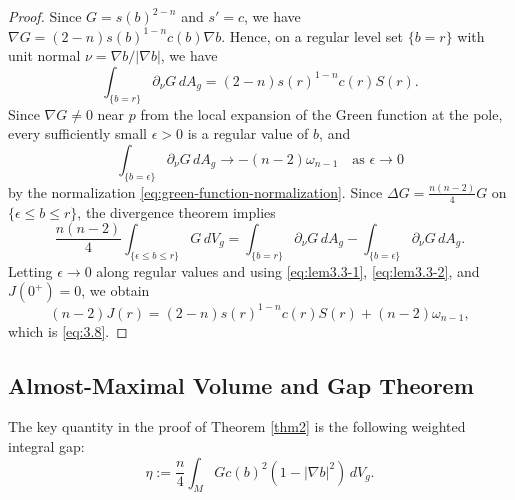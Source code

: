 \documentclass[11pt]{amsart}
\theoremstyle{plain}
\numberwithin{equation}{section}
\newcommand{\dvol}{\,dV_g}
\newcommand{\darea}{\,dA_g}
\newcommand{\bls}{\{b=r\}}
\begin{document}
\begin{proof}
Since $G=s(b)^{2-n}$ and $s'=c$, we have $\nabla G=(2-n)s(b)^{1-n}c(b)\nabla b$. Hence, on a regular level set $\bls$ with unit normal $\nu=\nabla b/|\nabla b|$, we have
\begin{equation}\label{eq:lem3.3-1}
\int_{\bls}\partial_\nu G\darea=(2-n)s(r)^{1-n}c(r)S(r).
\end{equation}
Since $\nabla G\neq 0$ near $p$ from the local expansion of the Green function at the pole, every sufficiently small $\epsilon>0$ is a regular value of $b$, and 
\begin{equation}\label{eq:lem3.3-2}
\int_{\{b=\epsilon\}}\partial_\nu G\darea\rightarrow -(n-2)\omega_{n-1}\quad\text{as $\epsilon\rightarrow0$}
\end{equation}
by the normalization \eqref{eq:green-function-normalization}. Since $\Delta G=\frac{n(n-2)}{4}G$ on $\{\epsilon\le b\le r\}$, the divergence theorem implies
\begin{equation*}
\frac{n(n-2)}{4}\int_{\{\epsilon\le b\le r\}}G \dvol=\int_{\bls}\partial_\nu G\darea-\int_{\{b=\epsilon\}}\partial_\nu G\darea.
\end{equation*}
Letting $\epsilon\rightarrow0$ along regular values and using \eqref{eq:lem3.3-1}, \eqref{eq:lem3.3-2}, and $J(0^+)=0$, we obtain
\begin{equation*}
(n-2)J(r)=(2-n)s(r)^{1-n}c(r)S(r)+(n-2)\omega_{n-1},
\end{equation*}
which is \eqref{eq:3.8}.
\end{proof}

\subsection{Almost-Maximal Volume and Gap Theorem}
The key quantity in the proof of Theorem \ref{thm2} is the following weighted integral gap:
\begin{equation}\label{eq:weighted integral gap}
\eta:=\frac{n}{4}\int_M Gc(b)^2(1-|\nabla b|^2)\dvol.
\end{equation}
\end{document}
